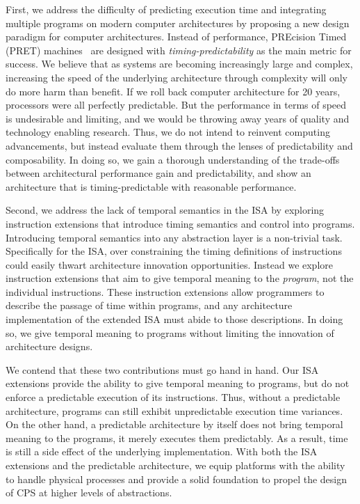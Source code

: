 First, we address the difficulty of predicting execution time and integrating multiple programs on modern computer architectures by proposing a new design paradigm for computer architectures.
Instead of performance, PREcision Timed (PRET) machines~\cite{edwards2007case} are designed with \textit{timing-predictability} as the main metric for success.   
We believe that as systems are becoming increasingly large and complex, increasing the speed of the underlying architecture through complexity will only do more harm than benefit.  
If we roll back computer architecture for 20 years, processors were all perfectly predictable.
But the performance in terms of speed is undesirable and limiting, and we would be throwing away years of quality and technology enabling research. 
Thus, we do not intend to reinvent computing advancements, but instead evaluate them through the lenses of predictability and composability.
In doing so, we gain a thorough understanding of the trade-offs between architectural performance gain and predictability, and show an architecture that is timing-predictable with reasonable performance.      

Second, we address the lack of temporal semantics in the ISA by exploring instruction extensions that introduce timing semantics and control into programs.
Introducing temporal semantics into any abstraction layer is a non-trivial task. 
Specifically for the ISA, over constraining the timing definitions of instructions could easily thwart architecture innovation opportunities.
Instead we explore instruction extensions that aim to give temporal meaning to the \emph{program}, not the individual instructions. 
These instruction extensions allow programmers to describe the passage of time within programs, and any architecture implementation of the extended ISA must abide to those descriptions. 
In doing so, we give temporal meaning to programs without limiting the innovation of architecture designs.

We contend that these two contributions must go hand in hand. 
Our ISA extensions provide the ability to give temporal meaning to programs, but do not enforce a predictable execution of its instructions.
Thus, without a predictable architecture, programs can still exhibit unpredictable execution time variances.    
On the other hand, a predictable architecture by itself does not bring temporal meaning to the programs, it merely executes them predictably.
As a result, time is still a side effect of the underlying implementation.
With both the ISA extensions and the predictable architecture, we equip platforms with the ability to handle physical processes and provide 
a solid foundation to propel the design of CPS at higher levels of abstractions.       
 
